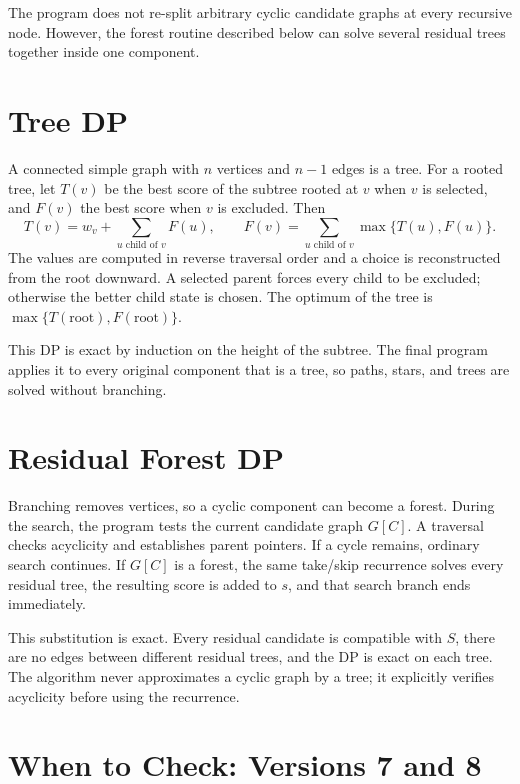 \documentclass[12pt,a4paper]{report}
\begin{document}
The program does not re-split arbitrary cyclic candidate graphs at every
recursive node.  However, the forest routine described below can solve several
residual trees together inside one component.

\section{Tree DP}

A connected simple graph with $n$ vertices and $n-1$ edges is a tree.  For a
rooted tree, let $T(v)$ be the best score of the subtree rooted at $v$ when $v$
is selected, and $F(v)$ the best score when $v$ is excluded.  Then
\[
T(v)=w_v+\sum_{u\text{ child of }v}F(u),\qquad
F(v)=\sum_{u\text{ child of }v}\max\{T(u),F(u)\}.
\]
The values are computed in reverse traversal order and a choice is reconstructed
from the root downward.  A selected parent forces every child to be excluded;
otherwise the better child state is chosen.  The optimum of the tree is
$\max\{T(\text{root}),F(\text{root})\}$.

This DP is exact by induction on the height of the subtree.  The final program
applies it to every original component that is a tree, so paths, stars, and
trees are solved without branching.

\section{Residual Forest DP}

Branching removes vertices, so a cyclic component can become a forest.  During
the search, the program tests the current candidate graph $G[C]$.  A traversal
checks acyclicity and establishes parent pointers.  If a cycle remains, ordinary
search continues.  If $G[C]$ is a forest, the same take/skip recurrence solves
every residual tree, the resulting score is added to $s$, and that search branch
ends immediately.

This substitution is exact.  Every residual candidate is compatible with $S$,
there are no edges between different residual trees, and the DP is exact on each
tree.  The algorithm never approximates a cyclic graph by a tree; it explicitly
verifies acyclicity before using the recurrence.

\section{When to Check: Versions 7 and 8}
\end{document}
